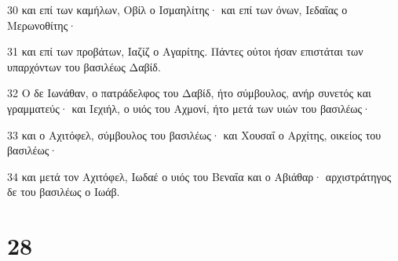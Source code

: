 \par 30 και επί των καμήλων, Οβίλ ο Ισμαηλίτης· και επί των όνων, Ιεδαΐας ο Μερωνοθίτης·
\par 31 και επί των προβάτων, Ιαζίζ ο Αγαρίτης. Πάντες ούτοι ήσαν επιστάται των υπαρχόντων του βασιλέως Δαβίδ.
\par 32 Ο δε Ιωνάθαν, ο πατράδελφος του Δαβίδ, ήτο σύμβουλος, ανήρ συνετός και γραμματεύς· και Ιεχιήλ, ο υιός του Αχμονί, ήτο μετά των υιών του βασιλέως·
\par 33 και ο Αχιτόφελ, σύμβουλος του βασιλέως· και Χουσαΐ ο Αρχίτης, οικείος του βασιλέως·
\par 34 και μετά τον Αχιτόφελ, Ιωδαέ ο υιός του Βεναΐα και ο Αβιάθαρ· αρχιστράτηγος δε του βασιλέως ο Ιωάβ.

\chapter{28}

